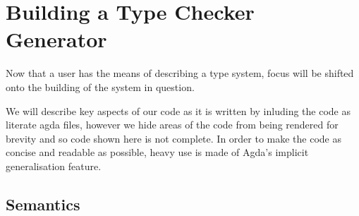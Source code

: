 \chapter{Building a Type Checker Generator}

Now that a user has the means of describing a type system, focus will
be shifted onto the building of the system in question.

We will describe key aspects of our code as it is written by inluding
the code as literate agda files, however we hide areas of the code
from being rendered for brevity and so code shown here is not
complete. In order to make the code as concise and readable as
possible, heavy use is made of Agda's implicit generalisation feature.












\section{Semantics}

